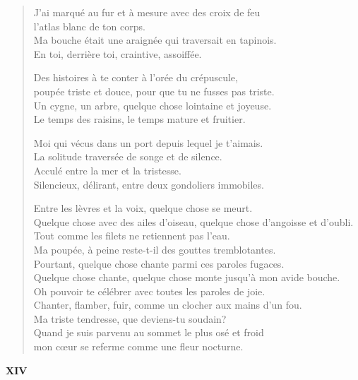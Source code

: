 \documentclass[11pt,a4paper]{book}
\begin{document}
\begin{verse}
  J'ai marqué au fur et à mesure avec des croix de feu \\
  l'atlas blanc de ton corps. \\
  Ma bouche était une araignée qui traversait en tapinois. \\
  En toi, derrière toi, craintive, assoiffée.

  Des histoires à te conter à l'orée du crépuscule, \\
  poupée triste et douce, pour que tu ne fusses pas triste. \\
  Un cygne, un arbre, quelque chose lointaine et joyeuse. \\
  Le temps des raisins, le temps mature et fruitier.

  Moi qui vécus dans un port depuis lequel je t'aimais. \\
  La solitude traversée de songe et de silence. \\
  Acculé entre la mer et la tristesse. \\
  Silencieux, délirant, entre deux gondoliers immobiles.

  Entre les lèvres et la voix, quelque chose se meurt. \\
  Quelque chose avec des ailes d'oiseau, quelque chose d'angoisse et d'oubli. \\
  Tout comme les filets ne retiennent pas l'eau. \\
  Ma poupée, à peine reste-t-il des gouttes tremblotantes. \\
  Pourtant, quelque chose chante parmi ces paroles fugaces. \\
  Quelque chose chante, quelque chose monte jusqu'à mon avide bouche. \\
  Oh pouvoir te célébrer avec toutes les paroles de joie. \\
  Chanter, flamber, fuir, comme un clocher aux mains d'un fou. \\
  Ma triste tendresse, que deviens-tu soudain? \\
  Quand je suis parvenu au sommet le plus osé et froid \\
  mon cœur se referme comme une fleur nocturne.
\end{verse}

\newpage


\begin{center} \textbf{XIV} \end{center}
\end{document}
